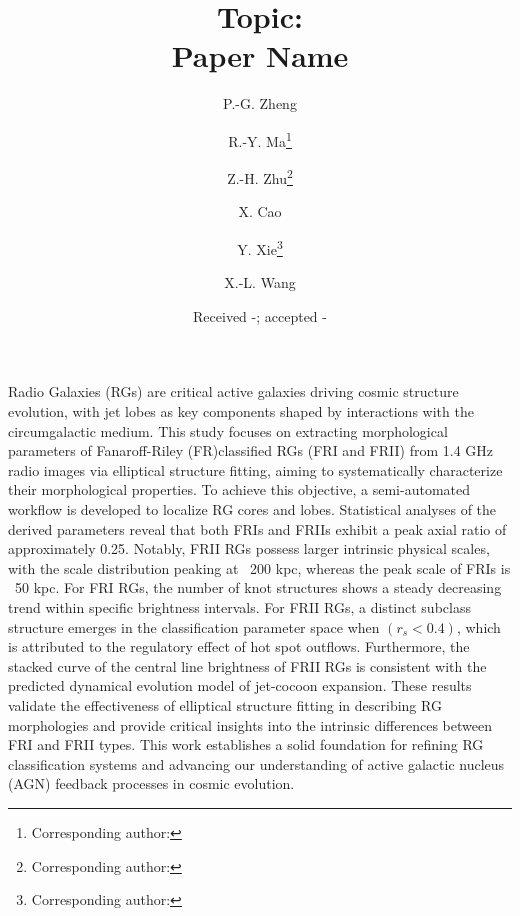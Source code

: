 \documentclass{aa}
\begin{document}
 

\renewcommand{\arraystretch}{1.5}
   
    \title{
    Topic: \\Paper Name 
    }

    \author{
        P.-G. Zheng
    \and R.-Y. Ma\thanks{Corresponding author: }
    \and Z.-H. Zhu\thanks{Corresponding author: \email{}}
    \and X. Cao
    \and Y. Xie\thanks{Corresponding author: }
    \and X.-L. Wang
    }
    




   \date{Received -; accepted -}


 \abstract
   {
   Radio Galaxies (RGs) are critical active galaxies driving cosmic structure evolution, with jet lobes as key components shaped by interactions with the circumgalactic medium. This study focuses on extracting morphological parameters of Fanaroff-Riley (FR)\textemdash classified RGs (FRI and FRII) from 1.4 GHz radio images via elliptical structure fitting, aiming to systematically characterize their morphological properties. To achieve this objective, a semi-automated workflow is developed to localize RG cores and lobes. Statistical analyses of the derived parameters reveal that both FRIs and FRIIs exhibit a peak axial ratio of approximately 0.25. Notably, FRII RGs possess larger intrinsic physical scales, with the scale distribution peaking at ~200 kpc, whereas the peak scale of FRIs is ~50 kpc. For FRI RGs, the number of knot structures shows a steady decreasing trend within specific brightness intervals. For FRII RGs, a distinct subclass structure emerges in the classification parameter space when $(r_s < 0.4)$, which is attributed to the regulatory effect of hot spot outflows. Furthermore, the stacked curve of the central line brightness of FRII RGs is consistent with the predicted dynamical evolution model of jet-cocoon expansion. These results validate the effectiveness of elliptical structure fitting in describing RG morphologies and provide critical insights into the intrinsic differences between FRI and FRII types. This work establishes a solid foundation for refining RG classification systems and advancing our understanding of active galactic nucleus (AGN) feedback processes in cosmic evolution. 
   }
 
\end{document}

